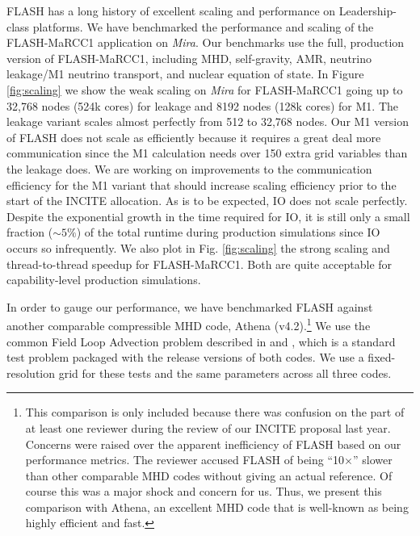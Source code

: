 FLASH has a long history of excellent scaling and performance on Leadership-class platforms.
We have benchmarked the performance and scaling of the FLASH-MaRCC1 application on {\it Mira}.
Our benchmarks use the full, production version of FLASH-MaRCC1, including MHD, self-gravity, AMR, neutrino leakage/M1 neutrino transport, and nuclear equation of state.
In Figure \ref{fig:scaling} we show the weak scaling on {\it Mira} for FLASH-MaRCC1 going up to 32,768 nodes (524k cores) for leakage and 8192 nodes (128k cores) for M1.
The leakage variant scales almost perfectly from 512 to 32,768 nodes.
Our M1 version of FLASH does not scale as efficiently because it requires a great deal more communication since the M1 calculation needs over 150 extra grid variables than the leakage does.
We are working on improvements to the communication efficiency for the M1 variant that should increase scaling efficiency prior to the start of the INCITE allocation.
As is to be expected, IO does not scale perfectly.
Despite the exponential growth in the time required for IO, it is still only a small fraction ($\sim5\%$) of the total runtime during production simulations since IO occurs so infrequently.
We also plot in Fig. \ref{fig:scaling} the strong scaling and thread-to-thread speedup for FLASH-MaRCC1.
Both are quite acceptable for capability-level production simulations.


In order to gauge our performance, we have benchmarked FLASH against another comparable compressible MHD code, Athena (v4.2).\footnote{This comparison is only included because there was confusion on the part of at least one reviewer during the review of our INCITE proposal last year.
Concerns were raised over the apparent inefficiency of FLASH based on our performance metrics.
The reviewer accused FLASH of being ``10$\times$'' slower than other comparable MHD codes without giving an actual reference.
Of course this was a major shock and concern for us.
Thus, we present this comparison with Athena, an excellent MHD code that is well-known as being highly efficient and fast.
}
We use the common Field Loop Advection problem described in \citet{Gardiner:2008dh} and \citet{Lee:2009kq}, which is a standard test problem packaged with the release versions of both codes.  We use a fixed-resolution grid for these tests and the same parameters across all three codes.



